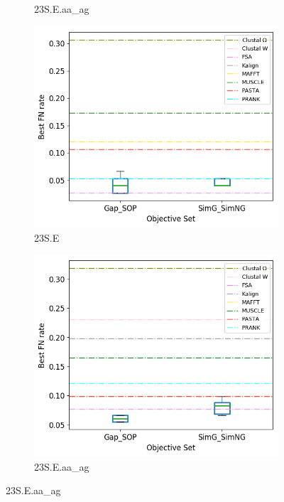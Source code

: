 \begin{figure}[!htbp]
\begin{adjustwidth}{-0.2cm}{}
\begin{subfigure}{0.5\columnwidth}
			\caption{23S.E.aa\_ag}
		\end{subfigure}
		\begin{subfigure}{0.5\columnwidth}
			\includegraphics[width=\columnwidth]{Figure/summary/precomputedInit/23S.E/objset_fnrate_rank}
			\caption{23S.E}
		\end{subfigure}	
		\begin{subfigure}{0.5\columnwidth}
			\includegraphics[width=\columnwidth]{Figure/summary/precomputedInit/23S.E.aa_ag/objset_fnrate_rank}
			\caption{23S.E.aa\_ag}

\end{subfigure}
\end{adjustwidth}
\end{figure}
